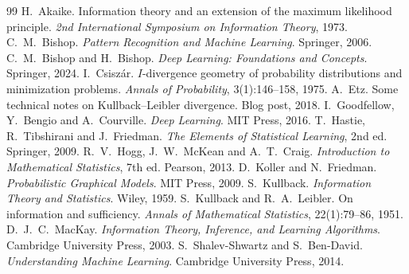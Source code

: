 \documentclass[11pt,oneside]{book}
\theoremstyle{definition}
\theoremstyle{plain}
\theoremstyle{remark}
\begin{document}
\begin{thebibliography}{99}\small
{} H.~Akaike. Information theory and an extension of the maximum likelihood principle.
  \emph{2nd International Symposium on Information Theory}, 1973.
 C.~M.~Bishop. \emph{Pattern Recognition and Machine Learning}. Springer, 2006.
 C.~M.~Bishop and H.~Bishop. \emph{Deep Learning: Foundations and Concepts}. Springer, 2024.
 I.~Csisz\'ar. $I$-divergence geometry of probability distributions and minimization problems.
  \emph{Annals of Probability}, 3(1):146--158, 1975.
 A.~Etz. Some technical notes on Kullback--Leibler divergence. Blog post, 2018.
 I.~Goodfellow, Y.~Bengio and A.~Courville. \emph{Deep Learning}. MIT Press, 2016.
 T.~Hastie, R.~Tibshirani and J.~Friedman. \emph{The Elements of Statistical Learning}, 2nd ed.
  Springer, 2009.
 R.~V.~Hogg, J.~W.~McKean and A.~T.~Craig. \emph{Introduction to Mathematical Statistics}, 7th ed.
  Pearson, 2013.
 D.~Koller and N.~Friedman. \emph{Probabilistic Graphical Models}. MIT Press, 2009.
 S.~Kullback. \emph{Information Theory and Statistics}. Wiley, 1959.
 S.~Kullback and R.~A.~Leibler. On information and sufficiency. \emph{Annals of Mathematical
  Statistics}, 22(1):79--86, 1951.
 D.~J.~C.~MacKay. \emph{Information Theory, Inference, and Learning Algorithms}. Cambridge
  University Press, 2003.
 S.~Shalev-Shwartz and S.~Ben-David. \emph{Understanding Machine Learning}. Cambridge University
  Press, 2014.
\end{thebibliography}
\end{document}
